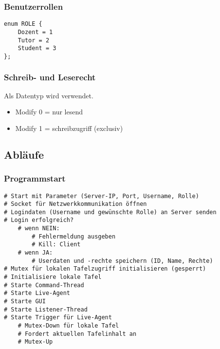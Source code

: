 \subsubsection{Benutzerrollen}
\begin{lstlisting}
enum ROLE {
    Dozent = 1
    Tutor = 2
    Student = 3
};
\end{lstlisting}

\subsubsection{Schreib- und Leserecht}
Als Datentyp wird  verwendet.
\begin{itemize}
	\item Modify 0 = nur lesend
	\item Modify 1 = schreibzugriff (exclusiv)
\end{itemize}

\subsection{Abläufe \label{Abläufe}}

\subsubsection{Programmstart}
\begin{lstlisting}
# Start mit Parameter (Server-IP, Port, Username, Rolle)
# Socket für Netzwerkkommunikation öffnen
# Logindaten (Username und gewünschte Rolle) an Server senden
# Login erfolgreich?
    # wenn NEIN: 
        # Fehlermeldung ausgeben
        # Kill: Client
    # wenn JA:
        # Userdaten und -rechte speichern (ID, Name, Rechte)
# Mutex für lokalen Tafelzugriff initialisieren (gesperrt)
# Initialisiere lokale Tafel
# Starte Command-Thread
# Starte Live-Agent
# Starte GUI
# Starte Listener-Thread
# Starte Trigger für Live-Agent
    # Mutex-Down für lokale Tafel
    # Fordert aktuellen Tafelinhalt an
    # Mutex-Up
\end{lstlisting}

